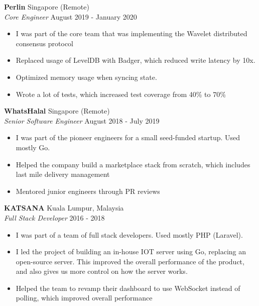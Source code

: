 \documentclass[a4paper]{article}
\begin{document}
\textbf{Perlin} \hfill Singapore (Remote)\\
\textit{Core Engineer} \hfill August 2019 - January 2020\\
\vspace{-1mm}
\begin{itemize} \itemsep 1pt
	\item I was part of the core team that was implementing the Wavelet distributed consensus protocol
	\item Replaced usage of LevelDB with Badger, which reduced write latency by 10x.
	\item Optimized memory usage when syncing state.
	\item Wrote a lot of tests, which increased test coverage from 40\% to 70\%
\end{itemize}

\textbf{WhatsHalal} \hfill Singapore (Remote)\\
\textit{Senior Software Engineer} \hfill August 2018 - July 2019\\
\vspace{-1mm}
\begin{itemize} \itemsep 1pt
	\item I was part of the pioneer engineers for a small seed-funded startup. Used mostly Go.
	\item Helped the company build a marketplace stack from scratch, which includes last mile delivery management
	\item Mentored junior engineers through PR reviews
\end{itemize}

\pagebreak
\textbf{KATSANA} \hfill Kuala Lumpur, Malaysia\\
\textit{Full Stack Developer} \hfill 2016 - 2018\\
\vspace{-1mm}
\begin{itemize} \itemsep 1pt
	\item I was part of a team of full stack developers. Used mostly PHP (Laravel).
	\item I led the project of building an in-house IOT server using Go, replacing an open-source server. This improved the overall performance of the product, and also gives us more control on how the server works.
	\item Helped the team to revamp their dashboard to use WebSocket instead of polling, which improved overall performance
\end{itemize}
\end{document}
